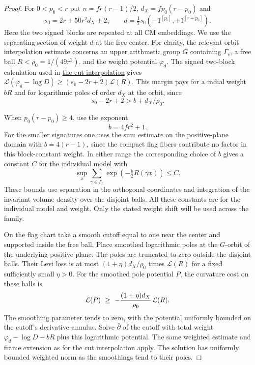 \begin{proof}
For $0<p_0<r$ put $n=f r(r-1)/2$, $d_X=f p_0(r-p_0)$ and
\[
  s_0=2r+50r^2d_X+2,\qquad d=\tfrac12s_0(-1^{[p_0]},+1^{[r-p_0]}).
\]
Here the two signed blocks are repeated at all CM embeddings.
We use the separating section of weight $d$ at the free center.
For clarity, the relevant orbit interpolation estimate concerns an
upper arithmetic group $G$ containing $\Gamma_c$, a free ball
$R<\rho_0=1/(49r^2)$, and the weight potential $\varphi_d$.
The signed two-block calculation used in \hyperref[par:slice-interpolation]{the cut interpolation}
gives $\mathcal L(\varphi_d-\log D)\ge (s_0-2r+2)\mathcal L(R)$.
This margin pays for a radial weight $bR$ and for logarithmic
poles of order $d_X$ at the orbit, since
\[
  s_0-2r+2 > b+d_X/\rho_0.
\]

When \(p_0(r-p_0)\ge4\), use the exponent
\[
  b=4fr^2+1.
\]
 For the smaller signatures
one uses the sum estimate on the positive-plane domain with
$b=4(r-1)$, since the compact flag fibers contribute no factor in
this block-constant weight. In either range the corresponding choice of \(b\) gives a constant \(C\) for the individual model with
\[
  \sup_x\sum_{\gamma\in\Gamma_c}\exp\!\left(-\tfrac b2 R(\gamma x)\right)\le C.
\]
 These bounds use separation in
the orthogonal coordinates and integration of the invariant
volume density over the disjoint balls. All these constants are
for the individual model and weight. Only the stated weight shift
will be used across the family.
\label{cor:paired-cusp-ranks-4}

On the flag chart take a smooth cutoff equal to one near the center
and supported inside the free ball. Place smoothed logarithmic
poles at the $G$-orbit of the underlying positive plane. The poles
are truncated to zero outside the disjoint balls. Their Levi loss
is at most $(1+\eta)d_X/\rho_0$ times $\mathcal L(R)$ for a fixed
sufficiently small $\eta>0$.
For the smoothed pole potential \(P\), the curvature cost on these balls is
\[
  {\cal L}(P)\ \ge\ -\frac{(1+\eta)d_X}{\rho_0}\,{\cal L}(R).
\]
 The smoothing parameter tends to zero, with the potential
uniformly bounded on the cutoff's derivative annulus.
Solve $\bar\partial$ of the cutoff with total weight
$\varphi_d-\log D-bR$ plus this logarithmic potential. The same
weighted estimate and frame extension as for the cut interpolation
apply. The solution has uniformly bounded weighted norm as the
smoothings tend to their poles.


\end{proof}
